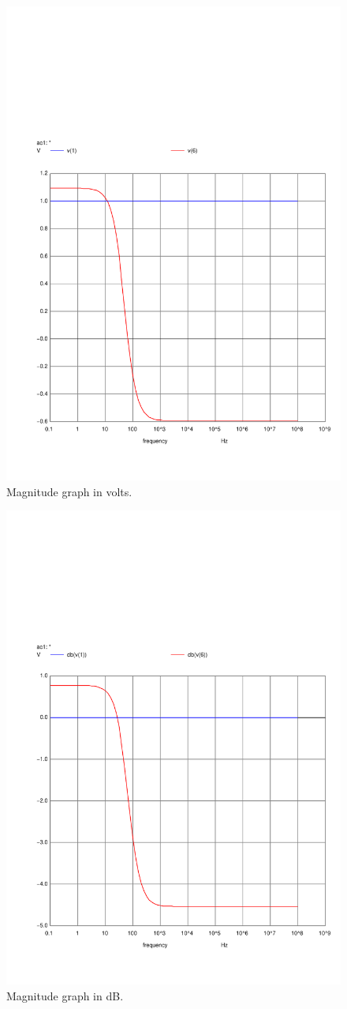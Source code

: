 \begin{figure}[H] \centering
    \includegraphics[width=0.6\linewidth, trim={2cm 1.5cm 0.5cm 6cm}, clip]{../Simulation/acm.pdf}
    \caption{Magnitude graph in volts.}
    \label{fig:FreqMagNg}
\end{figure}


\begin{figure}[H] \centering
    \includegraphics[width=0.6\linewidth, trim={2cm 1.5cm 0.5cm 6cm}, clip]{../Simulation/acm_db.pdf}
    \caption{Magnitude graph in dB.}
    \label{fig:FreqMagDBNg}
\end{figure}

